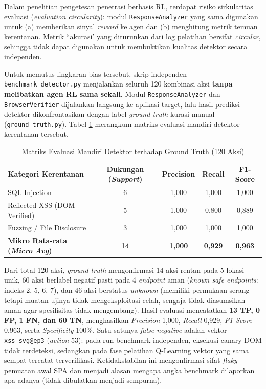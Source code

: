 Dalam penelitian pengetesan penetrasi berbasis RL, terdapat risiko sirkularitas evaluasi (\textit{evaluation circularity}): modul \texttt{ResponseAnalyzer} yang sama digunakan untuk (a) memberikan sinyal \textit{reward} ke agen dan (b) menghitung metrik temuan kerentanan. Metrik ``akurasi' yang diturunkan dari log pelatihan bersifat \textit{circular}, sehingga tidak dapat digunakan untuk membuktikan kualitas detektor secara independen.

Untuk memutus lingkaran bias tersebut, skrip independen \texttt{benchmark\_detector.py} menjalankan seluruh 120 kombinasi aksi \textbf{tanpa melibatkan agen RL sama sekali}. Modul \texttt{ResponseAnalyzer} dan \texttt{BrowserVerifier} dijalankan langsung ke aplikasi target, lalu hasil prediksi detektor dikonfrontasikan dengan label \textit{ground truth} kurasi manual (\texttt{ground\_truth.py}). Tabel \ref{tab:detector_benchmark} merangkum matriks evaluasi mandiri detektor kerentanan tersebut.

\begin{table}[H]
\centering
\caption{Matriks Evaluasi Mandiri Detektor terhadap Ground Truth (120 Aksi)}
\label{tab:detector_benchmark}
\begin{tabular}{|l|c|c|c|c|}
\hline
\textbf{Kategori Kerentanan} & \textbf{Dukungan (\textit{Support})} & \textbf{Precision} & \textbf{Recall} & \textbf{F1-Score} \\
\hline
SQL Injection & 6 & 1,000 & 1,000 & 1,000 \\
Reflected XSS (DOM Verified) & 5 & 1,000 & 0,800 & 0,889 \\ 
Fuzzing / File Disclosure & 3 & 1,000 & 1,000 & 1,000 \\
\hline
\textbf{Mikro Rata-rata (\textit{Micro Avg})} & \textbf{14} & \textbf{1,000} & \textbf{0,929} & \textbf{0,963} \\ 
\hline
\end{tabular}
\end{table}

Dari total 120 aksi, \textit{ground truth} mengonfirmasi 14 aksi rentan pada 5 lokasi unik, 60 aksi berlabel negatif pasti pada 4 \textit{endpoint} aman (\textit{known safe endpoints}: indeks 2, 5, 6, 7), dan 46 aksi berstatus \textit{unknown} (memiliki permukaan serang tetapi muatan ujinya tidak mengeksploitasi celah, sengaja tidak diasumsikan aman agar spesifisitas tidak mengembang). Hasil evaluasi mencatatkan \textbf{13 TP, 0 FP, 1 FN, dan 60 TN}, menghasilkan \textit{Precision} 1,000, \textit{Recall} 0,929, \textit{F1-Score} 0,963, serta \textit{Specificity} 100\%. 
Satu-satunya \textit{false negative} adalah vektor \texttt{xss\_svg@ep3} (\textit{action} 53): pada run benchmark independen, eksekusi canary DOM tidak terdeteksi, sedangkan pada fase pelatihan Q-Learning vektor yang sama sempat tercatat terverifikasi. Ketidakstabilan ini mengonfirmasi sifat \textit{flaky} pemuatan awal SPA dan menjadi alasan mengapa angka benchmark dilaporkan apa adanya (tidak dibulatkan menjadi sempurna). 

